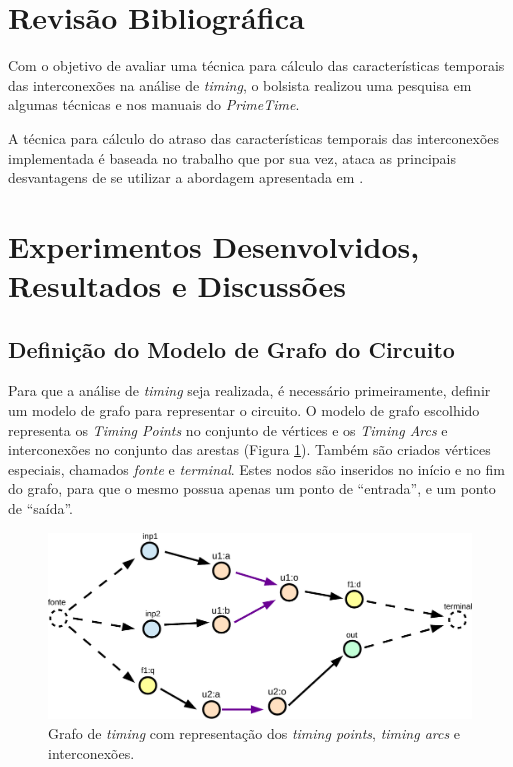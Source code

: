 \documentclass[
	12pt,				%
	openright,			%
	twoside,			%
	a4paper,			%
	english,			%
	french,				%
	spanish,			%
	brazil,				%
	]{abntex2}
\begin{document}
\section{Revisão Bibliográfica}

Com o objetivo de avaliar uma técnica para cálculo das características temporais das interconexões na análise de \textit{timing}, o bolsista realizou uma pesquisa em algumas técnicas e nos manuais do \textit{PrimeTime}. 

A técnica para cálculo do atraso das características temporais das interconexões implementada é baseada no trabalho \cite{PURI02} que por sua vez, ataca as principais desvantagens de se utilizar a abordagem apresentada em \cite{Kashyap00}.

\section{Experimentos Desenvolvidos, Resultados e Discussões}

\subsection{Definição do Modelo de Grafo do Circuito}
Para que a análise de \textit{timing} seja realizada, é necessário primeiramente, definir um modelo de grafo para representar o circuito. O modelo de grafo escolhido representa os \textit{Timing Points} no conjunto de vértices e os \textit{Timing Arcs} e interconexões no conjunto das arestas (Figura \ref{fig:grafo_timing_points}). Também são criados vértices especiais, chamados \textit{fonte} e \textit{terminal}. Estes nodos são inseridos no início e no fim do grafo, para que o mesmo possua apenas um ponto de ``entrada'', e um ponto de ``saída''.

\begin{figure}[ht]
\begin{center}
\includegraphics[width=\linewidth]{img/grafo_timing_points.pdf} 
\caption{Grafo de \textit{timing} com representação dos \textit{timing points}, \textit{timing arcs} e interconexões.}
\label{fig:grafo_timing_points}
\end{center}
\end{figure}
\end{document}
